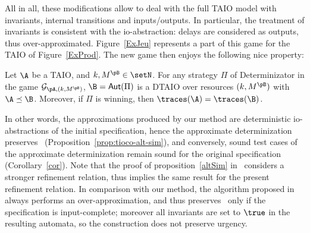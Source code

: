 \documentclass{LMCS}
\theoremstyle{plain}\newtheorem{proposition}[thm]{Proposition}
\begin{document}
All in all, these modifications allow to deal with the full TAIO model
with invariants, internal transitions and inputs/outputs.  In
particular, the treatment of invariants is consistent with the
io-abstraction: delays are considered as outputs, thus
over-approximated.
Figure~\ref{ExJeu} represents a part of this game for the TAIO of Figure~\ref{ExProd}.
The new game then enjoys the following nice
property:\begin{prop}
\label{altSim}
  Let $\A$ be a TAIO, and $k,M^\pB \in \setN$. 
  For any
  strategy $\Pi$ of Determinizator in the game
  $\mathcal{G}_{\pA,(k,M^\pB)}$, $\B=\mathsf{Aut}(\Pi)$ is a
  DTAIO over resources $(k,M^\pB)$ with $\A \preceq \B$. 
  Moreover, if $\Pi$ is winning, then
  $\traces(\A) =  \traces(\B)$.
\end{prop}

In other words, the approximations produced by our method are
deterministic io-abstractions of the initial specification, hence the
approximate determinization preserves
\tioco~(Proposition~\ref{prop:tioco-alt-sim}), and conversely,
sound test cases of the approximate determinization remain sound for the original specification (Corollary~\ref{cor}).  Note that the proof of
proposition~\ref{altSim} in~\cite{BertrandStainerJeronKrichen-RR2010}
considers a stronger refinement relation, thus implies the same result
for the present refinement relation. In comparison with our method,
the algorithm proposed in~\cite{KrichenTripakis09} always performs an
over-approximation, and thus preserves \tioco~only if the
specification is input-complete; moreover all invariants are
set to $\true$ in the resulting automata, so the construction does
not preserve urgency.
\end{document}
